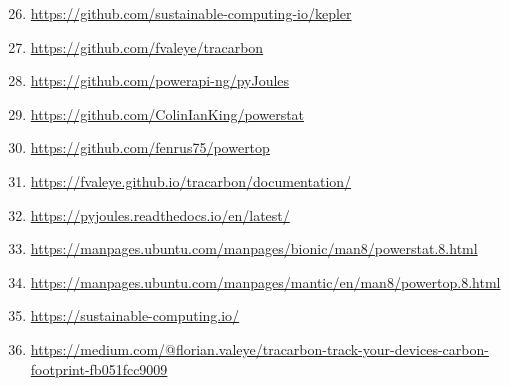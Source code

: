 \begin{enumerate}[label={\normalfont \textbf{(L\arabic*)}}] 
\setcounter{enumi}{25} 
 \item \label{link-c-Kepler} \url{https://github.com/sustainable-computing-io/kepler}
 \item \label{link-c-Tracarbon} \url{https://github.com/fvaleye/tracarbon}
 \item \label{link-c-PyJoules} \url{https://github.com/powerapi-ng/pyJoules}
 \item \label{link-c-Powerstat} \url{https://github.com/ColinIanKing/powerstat}
 \item \label{link-c-PowerTOP} \url{https://github.com/fenrus75/powertop}
 \item \label{link-d-Tracarbon} \url{https://fvaleye.github.io/tracarbon/documentation/}
 \item \label{link-d-PyJoules} \url{https://pyjoules.readthedocs.io/en/latest/}
 \item \label{link-d-Powerstat} \url{https://manpages.ubuntu.com/manpages/bionic/man8/powerstat.8.html}
 \item \label{link-d-PowerTOP} \url{https://manpages.ubuntu.com/manpages/mantic/en/man8/powertop.8.html}
 \item \label{link-b-Kepler} \url{https://sustainable-computing.io/}
 \item \label{link-b-Tracarbon} \url{https://medium.com/@florian.valeye/tracarbon-track-your-devices-carbon-footprint-fb051fcc9009}
\end{enumerate}